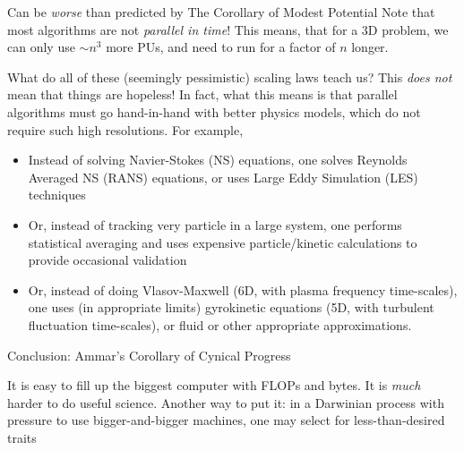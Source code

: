 \documentclass[aspectratio=169]{beamer}
\newcommand{\mypause}{}
\begin{document}
\begin{frame}{Can be \emph{worse} than predicted by The
    Corollary of Modest Potential}
  Note that most algorithms are not \emph{parallel in time}! This
  means, that for a 3D problem, we can only use $\sim n^3$ more PUs,
  and need to run for a factor of $n$ longer.
\end{frame}

\begin{frame}{What do all of these (seemingly pessimistic) scaling
    laws teach us?}
  This \emph{does not} mean that things are hopeless! In fact, what
  this means is that parallel algorithms must go hand-in-hand with
  better physics models, which do not require such high
  resolutions. For example, 
  \begin{itemize}
  \item Instead of solving Navier-Stokes (NS) equations, one solves
    Reynolds Averaged NS (RANS) equations, or uses Large Eddy
    Simulation (LES) techniques%
    \mypause%
  \item Or, instead of tracking very particle in a large system, one
    performs statistical averaging and uses expensive particle/kinetic
    calculations to provide occasional validation
    \mypause%
  \item Or, instead of doing Vlasov-Maxwell (6D, with plasma frequency
    time-scales), one uses (in appropriate limits) gyrokinetic
    equations (5D, with turbulent fluctuation time-scales), or fluid
    or other appropriate approximations.
  \end{itemize}%
\end{frame}

\begin{frame}{Conclusion: Ammar's Corollary of Cynical Progress}

  {\color{blue} It is easy to fill up the biggest computer with FLOPs
    and bytes. It is \emph{much} harder to do useful science.}%
  \vskip0.1in%
  Another way to put it: in a Darwinian process with pressure to use
  bigger-and-bigger machines, one may select for less-than-desired
  traits
\end{frame}
\end{document}
